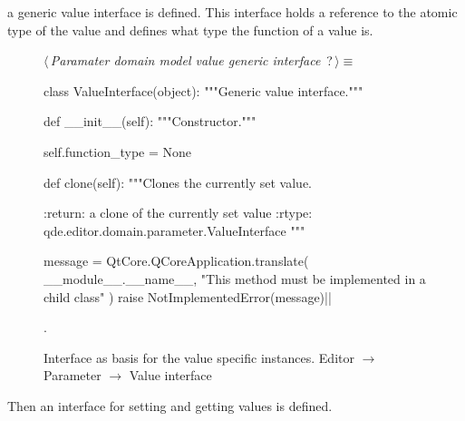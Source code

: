 \documentclass[%
    a4paper,    %
    justified,  %
    nobib,      %
    openany     %
]{tufte-book}
\makeatletter
\renewcommand{\label}[1]{\@tufte@label{##1}}%
\makeatother
\begin{document}
 a generic value interface is
defined. This interface holds a reference to the atomic type of the value and
defines what type the function of a value is.

\begin{figure}
\begin{flushleft} \small
\begin{minipage}{\linewidth}\label{scrap130}\raggedright\small
{} $\langle\,${\itshape Paramater domain model value generic interface}\nobreak\ {\footnotesize {?}}$\,\rangle\equiv$
\vspace{-1ex}
\begin{pythoncode}
class ValueInterface(object):
    """Generic value interface."""

    def __init__(self):
        """Constructor."""

        self.function_type = None

    def clone(self):
        """Clones the currently set value.

        :return: a clone of the currently set value
        :rtype:  qde.editor.domain.parameter.ValueInterface
        """

        message = QtCore.QCoreApplication.translate(
            __module__.__name__,
            "This method must be implemented in a child class"
        )
        raise NotImplementedError(message)|\NWsep|
\end{pythoncode}
\vspace{1.5ex}
\footnotesize
\begin{list}{}{\setlength{\itemsep}{-\parsep}\setlength{\itemindent}{-\leftmargin}}
\item {\NWtxtMacroNoRef}.

\item{}
\end{list}
\end{minipage}\vspace{4ex}
\end{flushleft}
\caption{Interface as basis for the value specific instances.
  \newline{}\newline{}Editor $\rightarrow$ Parameter $\rightarrow$
  Value interface}
\label{editor:lst:parameter:value-interface}
\end{figure}

Then an interface for setting and getting values is defined.
\end{document}
